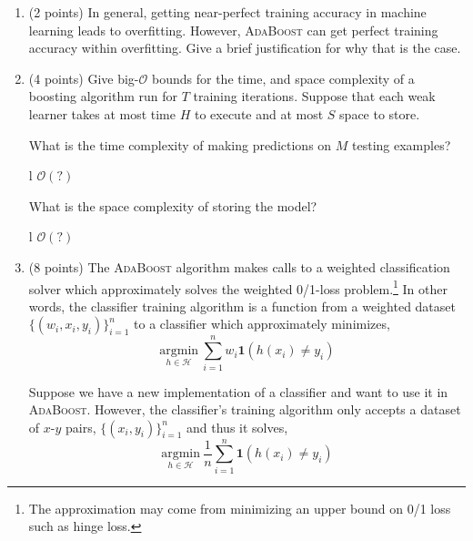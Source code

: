 \documentclass[11pt]{article}
\newcounter{QuestionCounter}
\newcounter{SubQuestionCounter}[QuestionCounter]
\newcommand{\newsubquestion}{\stepcounter{SubQuestionCounter}}
\begin{document}
{\begin{enumerate}[(1)]
\begin{answertext}{1cm}{}
\end{answertext}

\newpage
\newsubquestion
\item (2 points) In general, getting near-perfect training accuracy in machine learning
  leads to overfitting.  However, \textsc{AdaBoost} can get perfect training accuracy
  within overfitting.  Give a brief justification for why that is the case.

\begin{answertext}{4cm}{}

\end{answertext}


\item (4 points) Give big-$\mathcal{O}$ bounds for the time, and space complexity of a
  boosting algorithm run for $T$ training iterations.  Suppose that each weak
  learner takes at most time $H$ to execute and at most $S$ space to store.

  What is the time complexity of making predictions on $M$ testing examples?

\begin{answertable}{3cm}{}{l}
 $\mathcal{O}( ? )$
\end{answertable}


  What is the space complexity of storing the model?

\begin{answertable}{3cm}{}{l}
  $\mathcal{O}( ? )$ \\
\end{answertable}

\newpage
\item (8 points) The \textsc{AdaBoost} algorithm makes calls to a weighted classification
  solver which approximately solves the weighted 0/1-loss problem.\footnote{The
    approximation may come from minimizing an upper bound on 0/1 loss such as
    hinge loss.}  In other words, the classifier training algorithm is a
  function from a weighted dataset $\{ (w_i, x_i, y_i) \}_{i=1}^n$ to a
  classifier which approximately minimizes,
%
\begin{equation}\label{eq:weighted}
  \underset{h \in \mathcal{H}}{\mathrm{argmin}}\ \sum_{i=1}^n w_i \boldsymbol{1}(h(x_i) \ne y_i)
\end{equation}

  Suppose we have a new implementation of a classifier and want to use it in
  \textsc{AdaBoost}.  However, the classifier's training algorithm only accepts
  a dataset of $x$-$y$ pairs, $\{ (x_i, y_i) \}_{i=1}^n$ and thus it solves,
%
\begin{equation}\label{eq:unweighted}
  \underset{h \in \mathcal{H}}{\mathrm{argmin}}\ \frac{1}{n} \sum_{i=1}^n \boldsymbol{1}(h(x_i) \ne y_i)
\end{equation}


\end{enumerate}}
\end{document}
